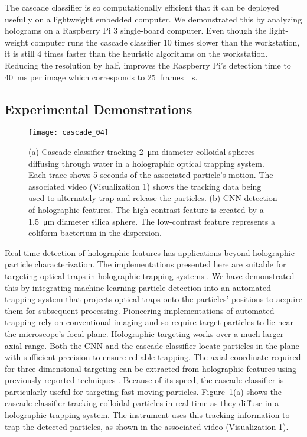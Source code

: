 The cascade classifier is so computationally efficient
that it can be deployed usefully on a lightweight
embedded computer. 
We demonstrated this by analyzing holograms on
a Raspberry Pi 3 single-board computer.
Even though the light-weight computer runs the
cascade classifier \num{10} times slower than the
workstation,  it is still \num{4} times faster than the heuristic 
algorithms on the workstation.
Reducing the resolution by half, improves the 
Raspberry Pi's detection time to \SI{40}{\ms} per image 
which corresponds to \SI{25}{frames \per \second}.

\subsection{Experimental Demonstrations}
\label{sec:experiment}

\begin{figure}[!b]
  \centering
  \texttt{[image: cascade\_04]}
  \caption{(a) Cascade classifier tracking \SI{2}{\um}-diameter
    colloidal spheres diffusing through water in a
    holographic optical trapping system.
    Each trace shows 5 seconds of the associated particle's motion.
    The associated video (Visualization 1) shows the tracking data
    being used to alternately trap and release the particles.
    (b) CNN detection of holographic features.
    The high-contrast feature is created by a \SI{1.5}{\um}
    diameter silica sphere.  The low-contrast feature
    represents a coliform bacterium in the dispersion.}
  \label{fig:autotrap}
\end{figure}

Real-time detection of holographic features has applications
beyond holographic particle characterization.
The implementations presented here are suitable for targeting
optical traps in holographic trapping systems \cite{grier03}.
We have demonstrated this by integrating machine-learning
particle detection into an automated trapping system that
projects optical traps onto the particles' positions to acquire
them for subsequent processing.
Pioneering implementations
of automated trapping \cite{chapin06} rely on conventional
imaging and so require target particles to lie near the microscope's
focal plane.
Holographic targeting works over a much larger axial
range.
Both the CNN and the cascade classifier
locate particles in the plane with sufficient precision to ensure
reliable trapping.
The axial coordinate required for three-dimensional targeting can
be extracted from holographic features using previously reported
techniques \cite{yevick14}.
Because of its speed, the cascade classifier is particularly useful
for targeting fast-moving particles.
Figure~\ref{fig:autotrap}(a) shows the cascade classifier tracking colloidal
particles in real time as they diffuse in a holographic trapping
system.
The instrument uses this tracking information to trap the
detected particles, as shown in the associated video
(Visualization 1).

